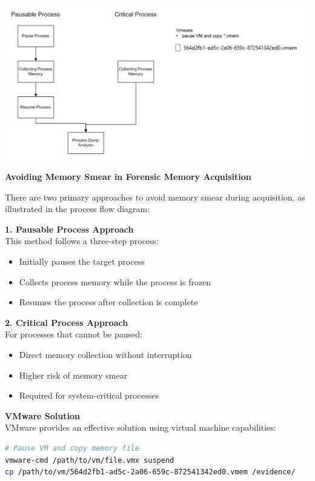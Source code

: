 \begin{center}
\includegraphics[width=\textwidth]{resources/13-memory-smear-avoid.png}
\end{center}
\textbf{Avoiding Memory Smear in Forensic Memory Acquisition}

There are two primary approaches to avoid memory smear during acquisition, as illustrated in the process flow diagram:

\textbf{1. Pausable Process Approach}\\
This method follows a three-step process:
\begin{itemize}
   \item Initially pauses the target process
   \item Collects process memory while the process is frozen
   \item Resumes the process after collection is complete
\end{itemize}

\textbf{2. Critical Process Approach}\\
For processes that cannot be paused:
\begin{itemize}
   \item Direct memory collection without interruption
   \item Higher risk of memory smear
   \item Required for system-critical processes
\end{itemize}

\textbf{VMware Solution}\\
VMware provides an effective solution using virtual machine capabilities:
\begin{lstlisting}[language=sh]
# Pause VM and copy memory file
vmware-cmd /path/to/vm/file.vmx suspend
cp /path/to/vm/564d2fb1-ad5c-2a06-659c-872541342ed0.vmem /evidence/
\end{lstlisting}

